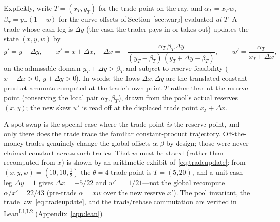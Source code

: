 \documentclass[runningheads]{llncs}
\begin{document}
Explicitly, write $T=(x_{T},y_{T})$ for the trade point on the ray, and
$\alpha_{T}=x_{T}\,w$, $\beta_{T}=y_{T}\,(1-w)$ for the curve offsets of
Section~\ref{sec:warp} evaluated \emph{at $T$}. A trade whose cash leg is
$\Delta y$ (the cash the trader pays in or takes out) updates the state
$(x,y,w)$ by
\begin{equation}
  y'=y+\Delta y,\qquad
  x'=x+\Delta x,\quad
  \Delta x=-\frac{\alpha_{T}\,\beta_{T}\,\Delta y}
                 {(y_{T}-\beta_{T})\,(y_{T}+\Delta y-\beta_{T})},\qquad
  w'=\frac{\alpha_{T}}{x_{T}+\Delta x},
  \label{eq:tradeupdate}
\end{equation}
on the admissible domain $y_{T}+\Delta y>\beta_{T}$ and subject to reserve
feasibility ($x+\Delta x>0$, $y+\Delta y>0$). In words: the flows
$\Delta x,\Delta y$ are the translated-constant-product amounts computed at the
trade's own point $T$ rather than at the reserve point (conserving the local pair
$\alpha_{T},\beta_{T}$), drawn from the pool's actual reserves $(x,y)$; the new
skew $w'$ is read off at the displaced trade point $x_{T}+\Delta x$.

A spot swap is the special case where the trade point \emph{is} the reserve
point, and only there does the trade trace the familiar constant-product
trajectory.
Off-the-money trades genuinely change the global offsets $\alpha,\beta$ by design;
those were never claimed constant across such trades. That $w$ must be stored
(rather than recomputed from $x$) is shown by an arithmetic exhibit
of~\eqref{eq:tradeupdate}: from $(x,y,w)=(10,10,\tfrac12)$ the $\theta=4$ trade
point is $T=(5,20)$, and a unit cash leg $\Delta y=1$ gives $\Delta x=-5/22$ and
$w'=11/21$---not the global recompute $\alpha/x'=22/43$ (pre-trade $\alpha=xw$
over the new reserve $x'$). The pool invariant, the trade
law~\eqref{eq:tradeupdate}, and the trade/rebase commutation are verified in
Lean\textsuperscript{L1,L2} (Appendix~\ref{app:lean}).
\end{document}
